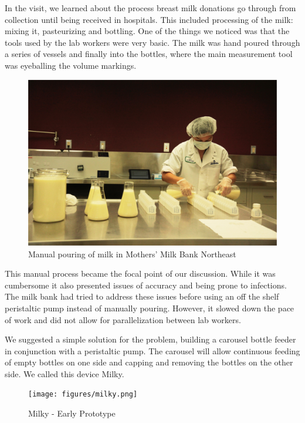 In the visit, we learned about the process breast milk donations go through from collection until being received in hospitals. This included processing of the milk: mixing it, pasteurizing and bottling. One of the things we noticed was that the tools used by the lab workers were very basic. The milk was hand poured through a series of vessels and finally into the bottles, where the main measurement tool was eyeballing the volume markings. 

   \begin{figure}[thpb]
      \centering
      \includegraphics[width=\textwidth]{figures/mmne-manual.png}
      \caption{Manual pouring of milk in Mothers' Milk Bank Northeast}
      \label{mmne-manual}
   \end{figure}

This manual process became the focal point of our discussion. While it was cumbersome it also presented issues of accuracy and being prone to infections. The milk bank had tried to address these issues before using an off the shelf peristaltic pump instead of manually pouring. However, it slowed down the pace of work and did not allow for parallelization between lab workers. 

We suggested a simple solution for the problem, building a carousel bottle feeder in conjunction with a peristaltic pump. The carousel will allow continuous feeding of empty bottles on one side and capping and removing the bottles on the other side. We called this device Milky. 

   \begin{figure}[thpb]
      \centering
      \texttt{[image: figures/milky.png]}
      \caption{Milky - Early Prototype}
      \label{milky}
   \end{figure}

